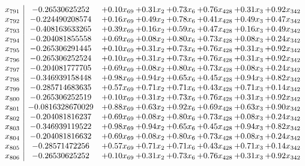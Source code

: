 \documentclass[8pt]{article}
\begin{document}
\[\begin{array}{c| c c@{\hskip 2pt} c@{\hskip 2pt} c@{\hskip 2pt} c@{\hskip 2pt} c@{\hskip 2pt} c@{\hskip 2pt} }
 x_{791}   &  -0.26530625252 & +  0.10 x_{69} & +  0.31 x_{2} & +  0.73 x_{6} & +  0.76 x_{428} & +  0.31 x_{3} & +  0.92 x_{342}\\
 x_{792}   &  -0.224490208574 & +  0.16 x_{69} & +  0.49 x_{2} & +  0.78 x_{6} & +  0.41 x_{428} & +  0.49 x_{3} & +  0.47 x_{342}\\
 x_{793}   &  -0.408163633265 & +  0.39 x_{69} & +  0.16 x_{2} & +  0.59 x_{6} & +  0.47 x_{428} & +  0.16 x_{3} & +  0.49 x_{342}\\
 x_{794}   &  -0.204081855558 & +  0.69 x_{69} & +  0.08 x_{2} & +  0.80 x_{6} & +  0.73 x_{428} & +  0.08 x_{3} & +  0.24 x_{342}\\
 x_{795}   &  -0.265306291445 & +  0.10 x_{69} & +  0.31 x_{2} & +  0.73 x_{6} & +  0.76 x_{428} & +  0.31 x_{3} & +  0.92 x_{342}\\
 x_{796}   &  -0.265306252524 & +  0.10 x_{69} & +  0.31 x_{2} & +  0.73 x_{6} & +  0.76 x_{428} & +  0.31 x_{3} & +  0.92 x_{342}\\
 x_{797}   &  -0.204081777705 & +  0.69 x_{69} & +  0.08 x_{2} & +  0.80 x_{6} & +  0.73 x_{428} & +  0.08 x_{3} & +  0.24 x_{342}\\
 x_{798}   &  -0.346939158448 & +  0.98 x_{69} & +  0.94 x_{2} & +  0.65 x_{6} & +  0.45 x_{428} & +  0.94 x_{3} & +  0.82 x_{342}\\
 x_{799}   &  -0.285714683635 & +  0.57 x_{69} & +  0.71 x_{2} & +  0.71 x_{6} & +  0.43 x_{428} & +  0.71 x_{3} & +  0.14 x_{342}\\
 x_{800}   &  -0.265306252519 & +  0.10 x_{69} & +  0.31 x_{2} & +  0.73 x_{6} & +  0.76 x_{428} & +  0.31 x_{3} & +  0.92 x_{342}\\
 x_{801}   &  -0.0816328670029 & +  0.88 x_{69} & +  0.63 x_{2} & +  0.92 x_{6} & +  0.69 x_{428} & +  0.63 x_{3} & +  0.90 x_{342}\\
 x_{802}   &  -0.204081816237 & +  0.69 x_{69} & +  0.08 x_{2} & +  0.80 x_{6} & +  0.73 x_{428} & +  0.08 x_{3} & +  0.24 x_{342}\\
 x_{803}   &  -0.346939119522 & +  0.98 x_{69} & +  0.94 x_{2} & +  0.65 x_{6} & +  0.45 x_{428} & +  0.94 x_{3} & +  0.82 x_{342}\\
 x_{804}   &  -0.204081816632 & +  0.69 x_{69} & +  0.08 x_{2} & +  0.80 x_{6} & +  0.73 x_{428} & +  0.08 x_{3} & +  0.24 x_{342}\\
 x_{805}   &  -0.28571472256 & +  0.57 x_{69} & +  0.71 x_{2} & +  0.71 x_{6} & +  0.43 x_{428} & +  0.71 x_{3} & +  0.14 x_{342}\\
 x_{806}   &  -0.26530625252 & +  0.10 x_{69} & +  0.31 x_{2} & +  0.73 x_{6} & +  0.76 x_{428} & +  0.31 x_{3} & +  0.92 x_{342}\\

\end{array}\]
\end{document}
